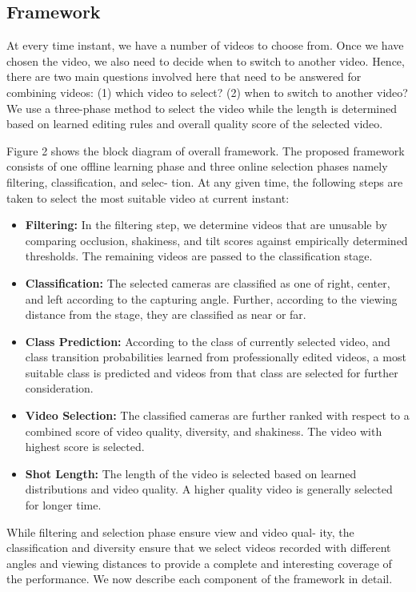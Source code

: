 \documentclass{sig-alternate-05-2015}
\begin{document}
\subsection{Framework}
At every time instant, we have a number of videos to choose
from. Once we have chosen the video, we also need to decide when
to switch to another video. Hence, there are two main questions
involved here that need to be answered for combining videos: (1)
which video to select? (2) when to switch to another video? We
use a three-phase method to select the video while the length is
determined based on learned editing rules and overall quality score
of the selected video.\par
Figure 2 shows the block diagram of overall framework. The
proposed framework consists of one offline learning phase and three
online selection phases namely filtering, classification, and selec-
tion. At any given time, the following steps are taken to select the
most suitable video at current instant:
\begin{itemize}
    \item \textbf{Filtering:} In the filtering step, we determine videos that are
unusable by comparing occlusion, shakiness, and tilt scores
against empirically determined thresholds. The remaining
videos are passed to the classification stage.
    \item \textbf{Classification:} The selected cameras are classified as one
of right, center, and left according to the capturing angle.
Further, according to the viewing distance from the stage,
they are classified as near or far.
    \item \textbf{Class Prediction:} According to the class of currently selected video, and class transition probabilities learned from
professionally edited videos, a most suitable class is predicted and videos from that class are selected for further consideration.
    \item \textbf{Video Selection:} The classified cameras are further ranked
with respect to a combined score of video quality, diversity,
and shakiness. The video with highest score is selected.
    \item \textbf{Shot Length:} The length of the video is selected based on
learned distributions and video quality. A higher quality video
is generally selected for longer time.
\end{itemize}\par
While filtering and selection phase ensure view and video qual-
ity, the classification and diversity ensure that we select videos
recorded with different angles and viewing distances to provide a
complete and interesting coverage of the performance. We now
describe each component of the framework in detail.
\end{document}
